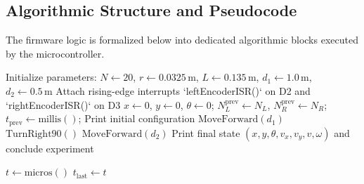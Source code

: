 \documentclass[11pt,a4paper]{article}
\begin{document}
\subsection{Algorithmic Structure and Pseudocode}
The firmware logic is formalized below into dedicated algorithmic blocks executed by the microcontroller.

\begin{algorithm}[H]
\small
\SetAlFnt{\small}
\SetAlCapFnt{\small}
\SetAlCapNameFnt{\small}
\setlength{\algomargin}{0.8em}
\DontPrintSemicolon
\caption{Main autonomous odometry and kinematics experiment}
\label{algo_main}
Initialize parameters: $N \leftarrow 20$, $r \leftarrow 0.0325\,\text{m}$, $L \leftarrow 0.135\,\text{m}$, $d_1 \leftarrow 1.0\,\text{m}$, $d_2 \leftarrow 0.5\,\text{m}$\;
Attach rising-edge interrupts `leftEncoderISR()` on D2 and `rightEncoderISR()` on D3\;
$x \leftarrow 0$, $y \leftarrow 0$, $\theta \leftarrow 0$; $N_L^{\text{prev}} \leftarrow N_L$, $N_R^{\text{prev}} \leftarrow N_R$; $t_{\text{prev}} \leftarrow \text{millis}()$; Print initial configuration\;
$\text{MoveForward}(d_1)$ 
$\text{TurnRight90}()$ 
$\text{MoveForward}(d_2)$ 
Print final state $(x, y, \theta, v_x, v_y, v, \omega)$ and conclude experiment\;
\end{algorithm}

\vspace{0.08cm}
\begin{algorithm}[H]
\small
\SetAlFnt{\small}
\SetAlCapFnt{\small}
\SetAlCapNameFnt{\small}
\setlength{\algomargin}{0.8em}
\DontPrintSemicolon
\caption{Debounced direction-aware encoder ISR (Left wheel; Right is symmetric)}
\label{algo_isr}
$t \leftarrow \text{micros}()$\;
$t_{\text{last}} \leftarrow t$\;
\end{algorithm}
\end{document}
